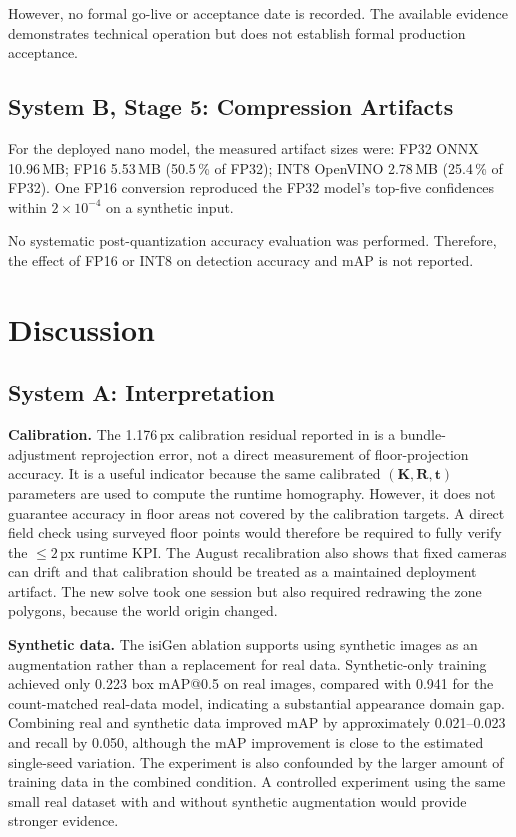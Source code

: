\documentclass[9pt,a4paper,twocolumn]{rho-class/rho}
\begin{document}
However, no formal go-live or acceptance date is recorded. The available evidence demonstrates technical operation but does not establish formal production acceptance.

\subsection{System B, Stage 5: Compression Artifacts}

For the deployed nano model, the measured artifact sizes were: FP32 ONNX 10.96\,MB; FP16 5.53\,MB (50.5\,\% of FP32); INT8 OpenVINO 2.78\,MB (25.4\,\% of FP32). One FP16 conversion reproduced the FP32 model's top-five confidences within $2 \times 10^{-4}$ on a synthetic input.

No systematic post-quantization accuracy evaluation was performed. Therefore, the effect of FP16 or INT8 on detection accuracy and mAP is not reported.

\section{Discussion}

\subsection{System A: Interpretation}

\textbf{Calibration.} The 1.176\,px calibration residual reported in  is a bundle-adjustment reprojection error, not a direct measurement of floor-projection accuracy. It is a useful indicator because the same calibrated $(\mathbf{K}, \mathbf{R}, \mathbf{t})$ parameters are used to compute the runtime homography. However, it does not guarantee accuracy in floor areas not covered by the calibration targets. A direct field check using surveyed floor points would therefore be required to fully verify the $\leq 2$\,px runtime KPI. The August recalibration also shows that fixed cameras can drift and that calibration should be treated as a maintained deployment artifact. The new solve took one session but also required redrawing the zone polygons, because the world origin changed.

\textbf{Synthetic data.} The isiGen ablation supports using synthetic images as an augmentation rather than a replacement for real data. Synthetic-only training achieved only 0.223 box mAP@0.5 on real images, compared with 0.941 for the count-matched real-data model, indicating a substantial appearance domain gap. Combining real and synthetic data improved mAP by approximately 0.021--0.023 and recall by 0.050, although the mAP improvement is close to the estimated single-seed variation. The experiment is also confounded by the larger amount of training data in the combined condition. A controlled experiment using the same small real dataset with and without synthetic augmentation would provide stronger evidence.
\end{document}

